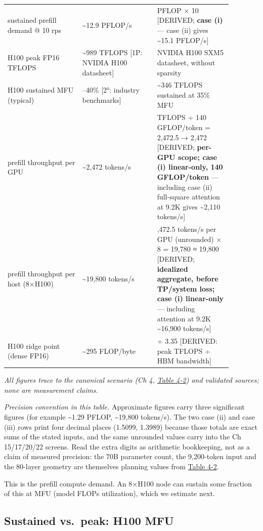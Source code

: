 \begin{longtable}[]{@{}
  >{\raggedright\arraybackslash}p{0.2927\linewidth}
  >{\raggedright\arraybackslash}p{0.2927\linewidth}
  >{\raggedright\arraybackslash}p{0.2927\linewidth}@{}}
sustained prefill demand @ 10 rps & \textasciitilde12.9 PFLOP/s & 1.29
PFLOP × 10 {[}DERIVED; \textbf{case (i)} --- case (ii) gives
\textasciitilde15.1 PFLOP/s{]} \\
H100 peak FP16 TFLOPS & \textasciitilde989 TFLOPS {[}1P: NVIDIA H100
datasheet{]} & NVIDIA H100 SXM5 datasheet, without sparsity \\
H100 sustained MFU (typical) & 30--40\% {[}2°: industry benchmarks{]} &
\textasciitilde346 TFLOPS sustained at 35\% MFU \\
prefill throughput per GPU & \textasciitilde2,472 tokens/s & 346.15
TFLOPS ÷ 140 GFLOP/token = 2,472.5 → 2,472 {[}DERIVED; \textbf{per-GPU
scope; case (i) linear-only, 140 GFLOP/token} --- including case (ii)
full-square attention at 9.2K gives \textasciitilde2,110 tokens/s{]} \\
prefill throughput per host (8×H100) & \textasciitilde19,800 tokens/s &
2,472.5 tokens/s per GPU (unrounded) × 8 = 19,780 ≈ 19,800 {[}DERIVED;
\textbf{idealized aggregate, before TP/system loss; case (i)
linear-only} --- including attention at 9.2K \textasciitilde16,900
tokens/s{]} \\
H100 ridge point (dense FP16) & \textasciitilde295 FLOP/byte & 989 ÷
3.35 {[}DERIVED: peak TFLOPS ÷ HBM bandwidth{]} \\
\end{longtable}

\emph{All figures trace to the canonical scenario (Ch 4, \hyperref[tab:4.2]{Table 4-2}) and
validated sources; none are measurement claims.}

\emph{Precision convention in this table.} Approximate figures carry
three significant figures (for example \textasciitilde1.29 PFLOP,
\textasciitilde19,800 tokens/s). The two case (ii) and case (iii) rows
print four decimal places (1.5099, 1.3989) because those totals are
exact sums of the stated inputs, and the same unrounded values carry
into the Ch 15/17/20/22 screens. Read the extra digits as arithmetic
bookkeeping, not as a claim of measured precision: the 70B parameter
count, the 9,200-token input and the 80-layer geometry are themselves
planning values from \hyperref[tab:4.2]{Table 4-2}.

This is the prefill compute demand. An 8×H100 node can sustain some
fraction of this at MFU (model FLOPs utilization), which we estimate
next.

\subsection{Sustained vs.~peak: H100
MFU}\label{sustained-vs.-peak-h100-mfu}

